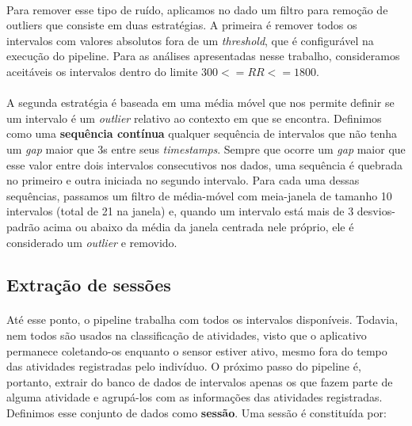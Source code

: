             \paragraph{} Para remover esse tipo de ruído, aplicamos no dado um filtro para remoção de outliers que consiste em duas estratégias. A primeira é remover todos os intervalos com valores absolutos fora de um \textit{threshold}, que é configurável na execução do pipeline. Para as análises apresentadas nesse trabalho, consideramos aceitáveis os intervalos dentro do limite $300 <= RR <= 1800$. 
            
            \paragraph{} A segunda estratégia é baseada em uma média móvel que nos permite definir se um intervalo é um \textit{outlier} relativo ao contexto em que se encontra. Definimos como uma \textbf{sequência contínua} qualquer sequência de intervalos que não tenha um \textit{gap} maior que 3s entre seus \textit{timestamps}. Sempre que ocorre um \textit{gap} maior que esse valor entre dois intervalos consecutivos nos dados, uma sequência é quebrada no primeiro e outra iniciada no segundo intervalo. Para cada uma dessas sequências, passamos um filtro de média-móvel com meia-janela de tamanho 10 intervalos (total de 21 na janela) e, quando um intervalo está mais de 3 desvios-padrão acima ou abaixo da média da janela centrada nele próprio, ele é considerado um \textit{outlier} e removido.

        
        \subsection{Extração de sessões}
        
            \paragraph{} Até esse ponto, o pipeline trabalha com todos os intervalos disponíveis. Todavia, nem todos são usados na classificação de atividades, visto que o aplicativo permanece coletando-os enquanto o sensor estiver ativo, mesmo fora do tempo das atividades registradas pelo indivíduo. O próximo passo do pipeline é, portanto, extrair do banco de dados de intervalos apenas os que fazem parte de alguma atividade e agrupá-los com as informações das atividades registradas. Definimos esse conjunto de dados como \textbf{sessão}. Uma sessão é constituída por:
            
